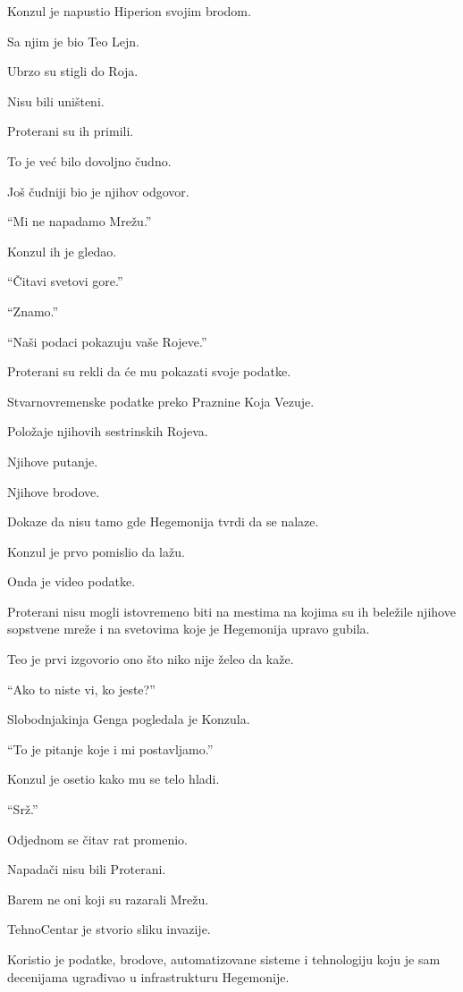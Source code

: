 \bigskip

Konzul je napustio Hiperion svojim brodom.

Sa njim je bio Teo Lejn.

Ubrzo su stigli do Roja.

Nisu bili uništeni.

Proterani su ih primili.

To je već bilo dovoljno čudno.

Još čudniji bio je njihov odgovor.

``Mi ne napadamo Mrežu.''

Konzul ih je gledao.

``Čitavi svetovi gore.''

``Znamo.''

``Naši podaci pokazuju vaše Rojeve.''

Proterani su rekli da će mu pokazati svoje podatke.

Stvarnovremenske podatke preko Praznine Koja Vezuje.

Položaje njihovih sestrinskih Rojeva.

Njihove putanje.

Njihove brodove.

Dokaze da nisu tamo gde Hegemonija tvrdi da se nalaze.

\bigskip

Konzul je prvo pomislio da lažu.

Onda je video podatke.

Proterani nisu mogli istovremeno biti na mestima na kojima su ih beležile njihove sopstvene mreže i na svetovima koje je Hegemonija upravo gubila.

Teo je prvi izgovorio ono što niko nije želeo da kaže.

``Ako to niste vi, ko jeste?''

Slobodnjakinja Genga pogledala je Konzula.

``To je pitanje koje i mi postavljamo.''

Konzul je osetio kako mu se telo hladi.

``Srž.''

\bigskip

Odjednom se čitav rat promenio.

Napadači nisu bili Proterani.

Barem ne oni koji su razarali Mrežu.

TehnoCentar je stvorio sliku invazije.

Koristio je podatke, brodove, automatizovane sisteme i tehnologiju koju je sam decenijama ugrađivao u infrastrukturu Hegemonije.

